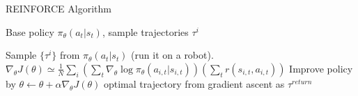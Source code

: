 \begin{algorithm}[t!]
\caption{REINFORCE Algorithm}
\begin{algorithmic}[1]
\label{alg:reinforce}
\REQUIRE Base policy $\pi_\theta(a_t|s_t)$, sample trajectories $\tau^i$

    \STATE Sample $\{\tau^i\}$ from $\pi_\theta(a_t|s_t)$ (run it on a robot).
    \STATE $\nabla_\theta J(\theta) \simeq \frac{1}{N}\sum_i\left(\sum_t\nabla_\theta \log\pi_\theta(a_{i,t}|s_{i,t})\right)\left(\sum_t r(s_{i,t},a_{i,t})\right)$
    \STATE Improve policy by $\theta \leftarrow \theta + \alpha\nabla_\theta J(\theta)$
\ENDWHILE
\RETURN optimal trajectory from gradient ascent as $\tau^{return}$
\end{algorithmic}
\end{algorithm}